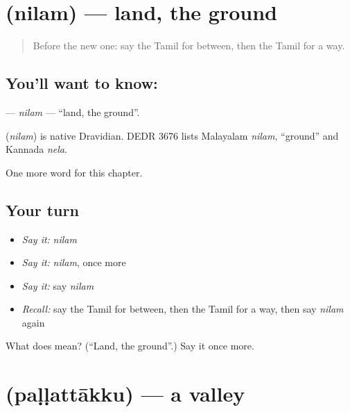 \section[\texorpdfstring{\ta{நிலம்} (nilam)}{நிலம் (nilam)}]{ (nilam) — land, the ground}

\label{lesson:TA-C264-nilam}



\begin{quote}
Before the new one: say the Tamil for between, then the Tamil for a way.
\end{quote}

\subsection*{You'll want to know: }
\textbf{} — \emph{nilam} — \textquotedblleft{}land, the ground\textquotedblright{}.

\begin{cousinweb}
\textbf{} (\emph{nilam}) is native Dravidian. DEDR 3676 lists Malayalam \emph{nilam}, \textquotedblleft{}ground\textquotedblright{} and Kannada \emph{nela}.
\end{cousinweb}

\begin{grammarlens}[title={What you've built}]
One more word for this chapter.
\end{grammarlens}

\subsection*{Your turn}
\begin{itemize}
\raggedright
  \item \emph{Say it:} \emph{nilam}
  \item \emph{Say it:} \emph{nilam}, once more
  \item \emph{Say it:} say \emph{nilam}
  \item \emph{Recall:} say the Tamil for between, then the Tamil for a way, then say \emph{nilam} again
\end{itemize}

\begin{tcolorbox}[breakable,colback=teal!4,colframe=teal!35!black,title={Before you move on}]
What does  mean? (\textquotedblleft{}Land, the ground\textquotedblright{}.) Say it once more.
\end{tcolorbox}
\section[\texorpdfstring{\ta{பள்ளத்தாக்கு} (paḷḷattākku)}{பள்ளத்தாக்கு (paḷḷattākku)}]{ (paḷḷattākku) — a valley}

